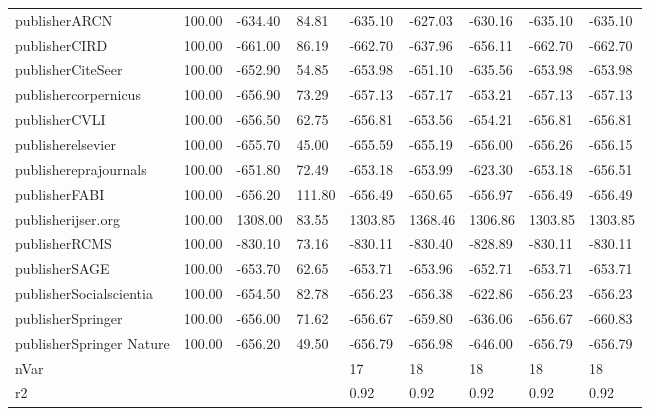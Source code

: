 \documentclass[12pt, english]{article}
\begin{document}
\begin{table}[H]
{\begin{tabular}{@{}lllllllll@{}}
                publisherARCN               & 100.00 & -634.40 & 84.81  & -635.10 & -627.03 & -630.16 & -635.10 & -635.10 \\
                publisherCIRD               & 100.00 & -661.00 & 86.19  & -662.70 & -637.96 & -656.11 & -662.70 & -662.70 \\
                publisherCiteSeer           & 100.00 & -652.90 & 54.85  & -653.98 & -651.10 & -635.56 & -653.98 & -653.98 \\
                publishercorpernicus        & 100.00 & -656.90 & 73.29  & -657.13 & -657.17 & -653.21 & -657.13 & -657.13 \\
                publisherCVLI               & 100.00 & -656.50 & 62.75  & -656.81 & -653.56 & -654.21 & -656.81 & -656.81 \\
                publisherelsevier           & 100.00 & -655.70 & 45.00  & -655.59 & -655.19 & -656.00 & -656.26 & -656.15 \\
                publishereprajournals       & 100.00 & -651.80 & 72.49  & -653.18 & -653.99 & -623.30 & -653.18 & -656.51 \\
                publisherFABI               & 100.00 & -656.20 & 111.80 & -656.49 & -650.65 & -656.97 & -656.49 & -656.49 \\
                publisherijser.org          & 100.00 & 1308.00 & 83.55  & 1303.85 & 1368.46 & 1306.86 & 1303.85 & 1303.85 \\
                publisherRCMS               & 100.00 & -830.10 & 73.16  & -830.11 & -830.40 & -828.89 & -830.11 & -830.11 \\
                publisherSAGE               & 100.00 & -653.70 & 62.65  & -653.71 & -653.96 & -652.71 & -653.71 & -653.71 \\
                publisherSocialscientia     & 100.00 & -654.50 & 82.78  & -656.23 & -656.38 & -622.86 & -656.23 & -656.23 \\
                publisherSpringer           & 100.00 & -656.00 & 71.62  & -656.67 & -659.80 & -636.06 & -656.67 & -660.83 \\
                publisherSpringer Nature    & 100.00 & -656.20 & 49.50  & -656.79 & -656.98 & -646.00 & -656.79 & -656.79 \\
                nVar                        &        &         &        & 17      & 18      & 18      & 18      & 18      \\
                r2                          &        &         &        & 0.92    & 0.92    & 0.92    & 0.92    & 0.92    \\

\end{tabular}}
\end{table}
\end{document}
